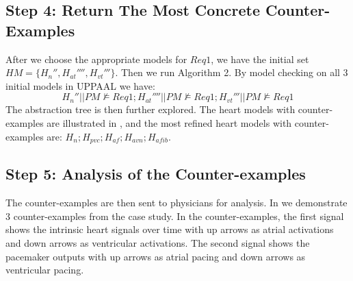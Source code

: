 \subsection{Step 4: Return The Most Concrete Counter-Examples}
After we choose the appropriate models for $Req1$, we have the initial set
$HM=\{H_n'',H_{at}'''',H_{vt}'''\}$.
Then we run Algorithm 2. By model checking on all 3 initial models in UPPAAL we have: 
$$H_n''||PM\not\models Req1;H_{at}''''||PM\not\models Req1;H_{vt}'''||PM\not\models Req1$$
The abstraction tree is then further explored. The heart models with counter-examples are illustrated in , and the most refined heart models with counter-examples are: $H_{n};H_{pvc};H_{af};H_{avn};H_{afib}$.


\subsection{Step 5: Analysis of the Counter-examples}
The counter-examples are then sent to physicians for analysis. In  we demonstrate 3 counter-examples from the case study. In the counter-examples, the first signal shows the intrinsic heart signals over time with up arrows as atrial activations and down arrows as ventricular activations. The second signal shows the pacemaker outputs with up arrows as atrial pacing and down arrows as ventricular pacing.%

